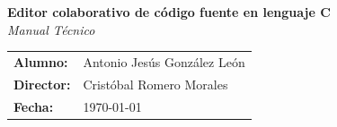 \begin{titlepage}
\begin{center}
		\textbf{\Large Editor colaborativo de código fuente en lenguaje C}
		\\
		\vspace{1cm}
		\emph{\Large Manual Técnico}
		\vspace{5cm}
		
	\end{center}

	\begin{flushright}
		\begin{tabular}{ll}
			\large{\textbf{Alumno:}}	&
			\large{Antonio Jesús González León} \\

			\large{\textbf{Director:}}	&
			\large{Cristóbal Romero Morales} \\

			\large{\textbf{Fecha:}}	&
			\large{\today} \\
		\end{tabular}
	\end{flushright}

\end{titlepage}

 \newpage{\pagestyle{empty}\cleardoublepage}
